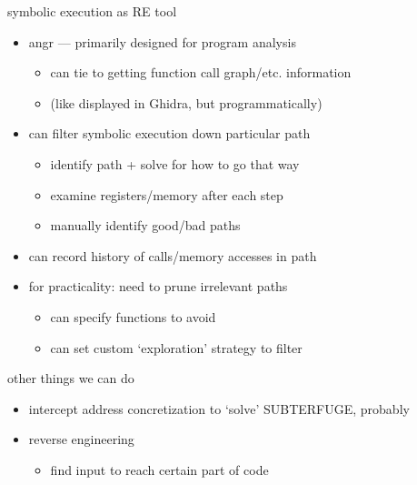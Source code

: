 \begin{frame}{symbolic execution as RE tool}
\begin{itemize}
\item angr --- primarily designed for program analysis
    \begin{itemize}
    \item can tie to getting function call graph/etc. information
    \item (like displayed in Ghidra, but programmatically)
    \end{itemize}
\item can filter symbolic execution down particular path
    \begin{itemize}
    \item identify path + solve for how to go that way
    \item examine registers/memory after each step
    \item manually identify good/bad paths
    \end{itemize}
\item can record history of calls/memory accesses in path
\item for practicality: need to prune irrelevant paths
    \begin{itemize}
    \item can specify functions to avoid
    \item can set custom `exploration' strategy to filter
    \end{itemize}
\end{itemize}
\end{frame}

\begin{frame}{other things we can do}
    \begin{itemize}
    \item intercept address concretization to `solve' SUBTERFUGE, probably
    \item reverse engineering
        \begin{itemize}
        \item find input to reach certain part of code
        \end{itemize}
    \end{itemize}
\end{frame}


